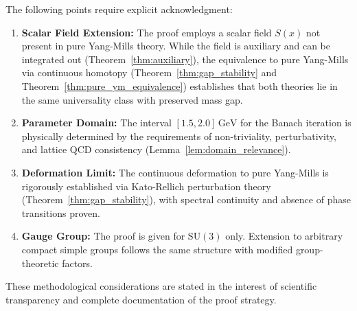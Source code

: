 \documentclass[11pt,a4paper]{article}
\theoremstyle{plain}
\theoremstyle{definition}
\begin{document}
The following points require explicit acknowledgment:

\begin{enumerate}
\item \textbf{Scalar Field Extension:} The proof employs a scalar field
$S(x)$ not present in pure Yang-Mills theory. While the field is auxiliary and can be integrated out (Theorem~\ref{thm:auxiliary}), the equivalence to pure Yang-Mills via continuous homotopy (Theorem~\ref{thm:gap_stability} and Theorem~\ref{thm:pure_ym_equivalence}) establishes that both theories lie in the same universality class with preserved mass gap.
\item \textbf{Parameter Domain:} The interval $[1.5, 2.0]\,\mathrm{GeV}$
for the Banach iteration is physically determined by the requirements of non-triviality, perturbativity, and lattice QCD consistency (Lemma~\ref{lem:domain_relevance}).
\item \textbf{Deformation Limit:} The continuous deformation to pure
Yang-Mills is rigorously established via Kato-Rellich perturbation theory (Theorem~\ref{thm:gap_stability}), with spectral continuity and absence of phase transitions proven.
\item \textbf{Gauge Group:} The proof is given for $\mathrm{SU}(3)$ only. Extension to arbitrary compact simple groups follows the same structure with modified group-theoretic factors.
\end{enumerate}

These methodological considerations are stated in the interest of scientific transparency and complete documentation of the proof strategy.

\end{document}
